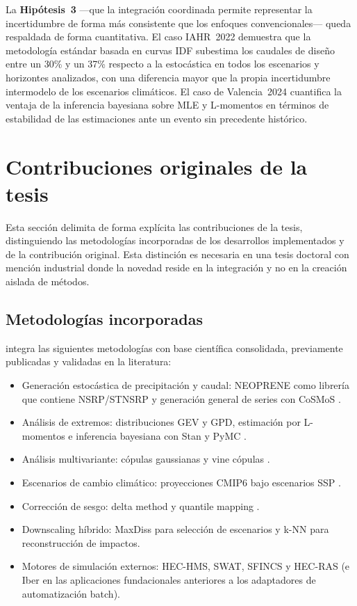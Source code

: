 La \textbf{Hipótesis~3} ---que la integración coordinada permite representar la incertidumbre de forma más consistente que los enfoques convencionales--- queda respaldada de forma cuantitativa. El caso IAHR~2022 demuestra que la metodología estándar basada en curvas IDF subestima los caudales de diseño entre un 30\% y un 37\% respecto a la estocástica en todos los escenarios y horizontes analizados, con una diferencia mayor que la propia incertidumbre intermodelo de los escenarios climáticos. El caso de Valencia~2024 cuantifica la ventaja de la inferencia bayesiana sobre MLE y L-momentos en términos de estabilidad de las estimaciones ante un evento sin precedente histórico.

\section{Contribuciones originales de la tesis}
\label{sec:contribuciones_originales}

Esta sección delimita de forma explícita las contribuciones de la tesis, distinguiendo las metodologías incorporadas de los desarrollos implementados y de la contribución original. Esta distinción es necesaria en una tesis doctoral con mención industrial donde la novedad reside en la integración y no en la creación aislada de métodos.

\subsection*{Metodologías incorporadas}

\hydra integra las siguientes metodologías con base científica consolidada, previamente publicadas y validadas en la literatura:

\begin{itemize}
  \item Generación estocástica de precipitación y caudal: NEOPRENE como librería que contiene NSRP/STNSRP \parencite{diezsierra2023neoprene} y generación general de series con CoSMoS \parencite{papalexiou2018storm}.
  \item Análisis de extremos: distribuciones GEV y GPD, estimación por L-momentos \parencite{hosking1997rfa} e inferencia bayesiana con Stan \parencite{carpenter2017stan} y PyMC \parencite{salvatier2016pymc}.
  \item Análisis multivariante: cópulas gaussianas \parencite{genest2007copulas,salvadori2007extremes} y vine cópulas \parencite{aas2009vines}.
  \item Escenarios de cambio climático: proyecciones CMIP6 bajo escenarios SSP \parencite{eyring2016cmip6,oneill2016ssp}.
  \item Corrección de sesgo: delta method y quantile mapping \parencite{teutschbein2012biascorrection}.
  \item Downscaling híbrido: MaxDiss para selección de escenarios y k-NN para reconstrucción de impactos.
  \item Motores de simulación externos: HEC-HMS, SWAT, SFINCS y HEC-RAS (e Iber en las aplicaciones fundacionales anteriores a los adaptadores de automatización batch).
\end{itemize}

